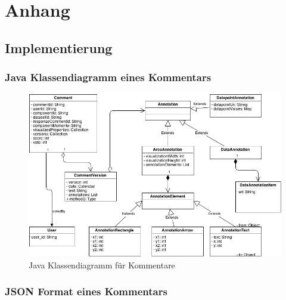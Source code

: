 \documentclass[
	headsepline,
	footsepline,
	fontsize=12pt,
	bibliography=totoc
]{scrbook}
\begin{document}
\newpage %

\appendix
\chapter{Anhang}

\section{Implementierung}

\subsection{Java Klassendiagramm eines Kommentars}
\label{appendix:implementierung:klassendiagramm}

\begin{figure}[htbp]
   \centering
   \includegraphics[width=\textwidth]{images/implementierung-kommentare-klassendiagramm.png}
   \caption{Java Klassendiagramm für Kommentare}
   \label{figure:kommentare-klassendiagramm}
\end{figure}

\subsection{JSON Format eines Kommentars}
\label{appendix:implementierung:json}
\end{document}
